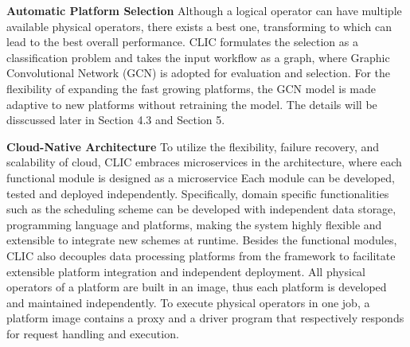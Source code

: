 
\textbf{Automatic Platform Selection} 
Although a logical operator can have multiple available physical operators, there exists a best one, transforming to which can lead to the best overall performance. 
CLIC formulates the selection as a classification problem and takes the input workflow as a graph, 
where Graphic Convolutional Network (GCN) is adopted for evaluation and selection. 
For the flexibility of expanding the fast growing platforms, the GCN model is made adaptive to new platforms without retraining the model.
The details will be disscussed later in Section 4.3 and Section 5.

\textbf{Cloud-Native Architecture} 
To utilize the flexibility, failure recovery, and scalability of cloud, CLIC embraces microservices in the architecture, where each functional module is designed as a microservice %
Each module can be developed, tested and deployed independently.
Specifically, domain specific functionalities such as the scheduling scheme can be developed with independent data storage, programming language and platforms, making the system highly flexible and extensible to integrate new schemes at runtime.
Besides the functional modules, CLIC also decouples data processing platforms from the framework to facilitate extensible platform integration and independent deployment.
All physical operators of a platform are built in an image, thus each platform is developed and maintained independently.
To execute physical operators in one job, a platform image contains a proxy and a driver program that respectively responds for request handling and execution.

